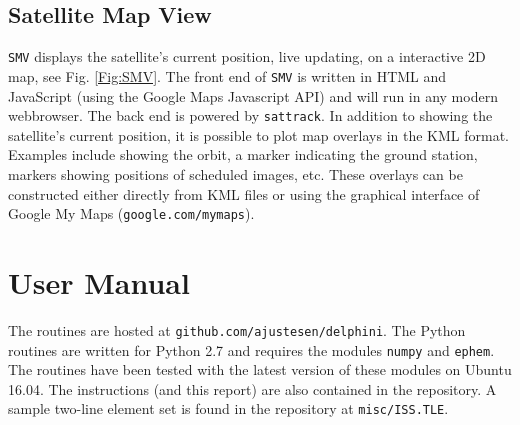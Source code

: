 \documentclass[10pt,a4paper]{article}
\begin{document}
\subsection{Satellite Map View}
\texttt{SMV} displays the satellite's current position, live updating, on a interactive 2D map, see Fig. \ref{Fig:SMV}. The front end of \texttt{SMV} is written in HTML and JavaScript (using the Google Maps Javascript API) and will run in any modern webbrowser. The back end is powered by \texttt{sattrack}. In addition to showing the satellite's current position, it is possible to plot map overlays in the KML format. Examples include showing the orbit, a marker indicating the ground station, markers showing positions of scheduled images, etc. These overlays can be constructed either directly from KML files or using the graphical interface of Google My Maps (\texttt{google.com/mymaps}). 



\section{User Manual}
The routines are hosted at \texttt{github.com/ajustesen/delphini}. The Python routines are written for Python 2.7 and requires the modules \texttt{numpy} and \texttt{ephem}. The routines have been tested with the latest version of these modules on Ubuntu 16.04. The instructions (and this report) are also contained in the repository. A sample two-line element set is found in the repository at \texttt{misc/ISS.TLE}.
\end{document}
